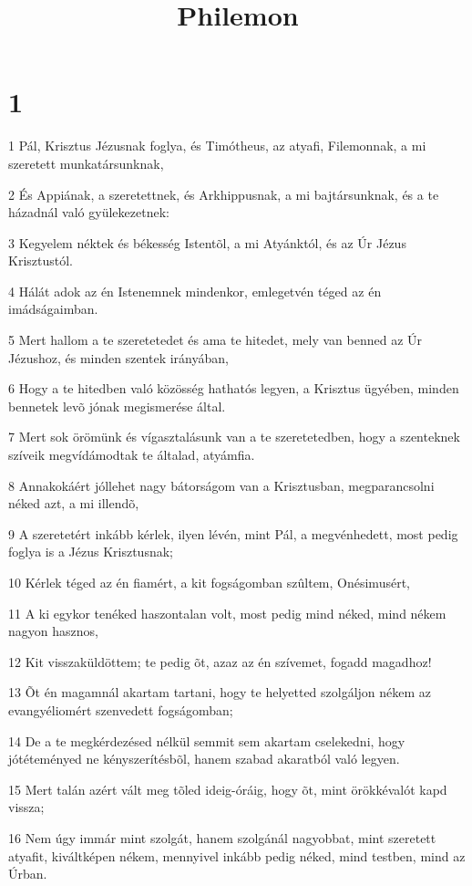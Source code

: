 

\title{Philemon}


\chapter{1}

\par 1 Pál, Krisztus Jézusnak foglya, és Timótheus, az atyafi, Filemonnak, a mi szeretett munkatársunknak,
\par 2 És Appiának, a szeretettnek, és Arkhippusnak, a mi bajtársunknak, és a te házadnál való gyülekezetnek:
\par 3 Kegyelem néktek és békesség Istentõl, a mi Atyánktól, és az Úr Jézus Krisztustól.
\par 4 Hálát adok az én Istenemnek mindenkor, emlegetvén téged az én imádságaimban.
\par 5 Mert hallom a te szeretetedet és ama te hitedet, mely van benned az Úr Jézushoz, és minden szentek irányában,
\par 6 Hogy a te hitedben való közösség hathatós legyen, a Krisztus ügyében, minden bennetek levõ jónak megismerése által.
\par 7 Mert sok örömünk és vígasztalásunk van a te szeretetedben, hogy a szenteknek szíveik megvídámodtak te általad, atyámfia.
\par 8 Annakokáért jóllehet nagy bátorságom van a Krisztusban, megparancsolni néked azt, a mi illendõ,
\par 9 A szeretetért inkább kérlek, ilyen lévén, mint Pál, a megvénhedett, most pedig foglya is a Jézus Krisztusnak;
\par 10 Kérlek téged az én fiamért, a kit fogságomban szûltem, Onésimusért,
\par 11 A ki egykor tenéked haszontalan volt, most pedig mind néked, mind nékem nagyon hasznos,
\par 12 Kit visszaküldöttem; te pedig õt, azaz az én szívemet, fogadd magadhoz!
\par 13 Õt én magamnál akartam tartani, hogy te helyetted szolgáljon nékem az evangyéliomért szenvedett fogságomban;
\par 14 De a te megkérdezésed nélkül semmit sem akartam cselekedni, hogy jótéteményed ne kényszerítésbõl, hanem szabad akaratból való legyen.
\par 15 Mert talán azért vált meg tõled ideig-óráig, hogy õt, mint örökkévalót kapd vissza;
\par 16 Nem úgy immár mint szolgát, hanem szolgánál nagyobbat, mint szeretett atyafit, kiváltképen nékem, mennyivel inkább pedig néked, mind testben, mind az Úrban.
